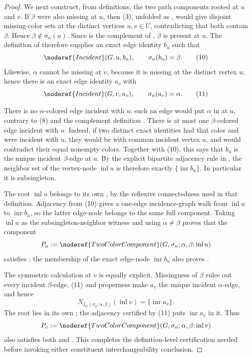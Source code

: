\begin{proof}
We next construct, from definitions, the two path components rooted at
$u$ and $v$.  If $\beta$ were also missing at $u$, then (3), unfolded as
, would give disjoint missing-color
sets at the distinct vertices $u,v\in U$, contradicting that both contain
$\beta$.  Hence $\beta\notin\overline\sigma_n(u)$.  Since
 is the complement of ,
$\beta$ is present at $u$.  The definition of
 therefore supplies an exact edge identity $b_u$
such that
\[
          \noderef{Incident}(G,u,b_u),\qquad
          \sigma_n(b_u)=\beta.                               \tag{10}
\]
Likewise, $\alpha$ cannot be missing at $v$, because it is missing at the
distinct vertex $u$; hence there is an exact edge identity $a_v$ with
\[
          \noderef{Incident}(G,v,a_v),\qquad
          \sigma_n(a_v)=\alpha.                              \tag{11}
\]

There is no $\alpha$-colored edge incident with $u$: such an edge would
put $\alpha$ in  at $u$, contrary to (8) and the
complement definition .  There is at most one
$\beta$-colored edge incident with $u$.  Indeed, if two distinct exact
identities had that color and were incident with $u$, they would be
 with common incident vertex $u$, and
 would contradict their equal nonempty
colors.  Together with (10), this says that $b_u$ is the unique incident
$\beta$-edge at $u$.  By the explicit bipartite adjacency rule in
, the neighbor set of the vertex-node
$\operatorname{inl}u$ is therefore exactly
$\{\operatorname{inr}b_u\}$.  In particular it is subsingleton.

The root $\operatorname{inl}u$ belongs to its own
, by the reflexive connectedness used in that
definition.  Adjacency from (10) gives a one-edge incidence-graph walk
from $\operatorname{inl}u$ to $\operatorname{inr}b_u$, so the latter
edge-node belongs to the same full component.  Taking
$\operatorname{inl}u$ as the subsingleton-neighbor witness and using
$\alpha\ne\beta$ proves that the component
\[
 P_u:=\noderef{TwoColorComponent}
          (G,\sigma_n;\alpha,\beta;\operatorname{inl}u)
\]
satisfies ; the membership of the exact
edge-node $\operatorname{inr}b_u$ also proves
.

The symmetric calculation at $v$ is equally explicit.  Missingness of
$\beta$ rules out every incident $\beta$-edge, (11) and properness make
$a_v$ the unique incident $\alpha$-edge, and hence
\[
 N_{I_G(\sigma_n;\alpha,\beta)}(\operatorname{inl}v)
     =\{\operatorname{inr}a_v\}.
\]
The root lies in its own ; the adjacency
certified by (11) puts $\operatorname{inr}a_v$ in it.  Thus
\[
 P_v:=\noderef{TwoColorComponent}
          (G,\sigma_n;\alpha,\beta;\operatorname{inl}v)
\]
also satisfies both  and
.  This completes the
definition-level certification needed before invoking either constituent
interchangeability conclusion.


\end{proof}
